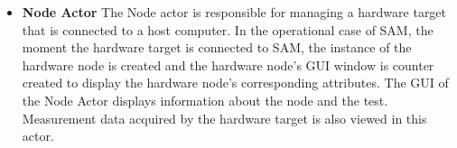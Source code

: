 \begin{itemize}[label={}]
\item \textbf{Node Actor} The Node actor is responsible for managing a hardware target that is connected to a host computer. 
In the operational case of SAM, the moment the hardware target is connected to SAM, the instance of the hardware node is created and the hardware node's \gls{GUI} window is counter created to display the hardware node's corresponding attributes. 
The GUI of the Node Actor displays information about the node and the test. 
Measurement data acquired by the hardware target is also viewed in this actor. %


\end{itemize}
